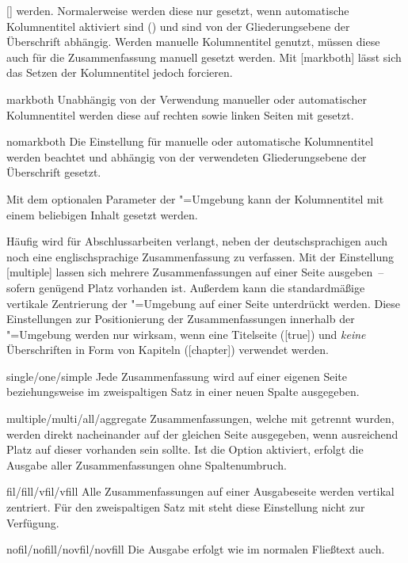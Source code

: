 \begin{Declaration}{[\PSet]}
werden. Normalerweise werden diese nur gesetzt, wenn automatische Kolumnentitel 
aktiviert sind () und sind von der Gliederungsebene der 
Überschrift abhängig. Werden manuelle Kolumnentitel genutzt, müssen diese auch 
für die Zusammenfassung manuell gesetzt werden. Mit [markboth] 
lässt sich das Setzen der Kolumnentitel jedoch forcieren.
%
\begin{values}
\item[markboth]
  Unabhängig von der Verwendung manueller oder automatischer Kolumnentitel 
  werden diese auf rechten sowie linken Seiten mit  gesetzt.
\item[nomarkboth]
  Die Einstellung für manuelle oder automatische Kolumnentitel werden beachtet 
  und abhängig von der verwendeten Gliederungsebene der Überschrift gesetzt.
\end{values}
%
Mit dem optionalen Parameter  der 
"=Umgebung kann der Kolumnentitel mit einem beliebigen 
Inhalt gesetzt werden.

Häufig wird für Abschlussarbeiten verlangt, neben der deutschsprachigen auch 
noch eine englischsprachige Zusammenfassung zu verfassen. Mit der Einstellung 
[multiple] lassen sich mehrere Zusammenfassungen auf einer 
Seite ausgeben~-- sofern genügend Platz vorhanden ist. Außerdem kann die 
standardmäßige vertikale Zentrierung der "=Umgebung 
auf einer Seite unterdrückt werden. Diese Einstellungen zur Positionierung der 
Zusammenfassungen innerhalb der "=Umgebung werden nur 
wirksam, wenn eine Titelseite ([true]) und \emph{keine} 
Überschriften in Form von Kapiteln ([chapter]) verwendet 
werden.
%
\begin{values}
\item[single/one/simple]
  Jede Zusammenfassung wird auf einer eigenen Seite
  beziehungsweise im zweispaltigen Satz in einer neuen Spalte ausgegeben.
\item[multiple/multi/all/aggregate]
  Zusammenfassungen, welche mit  getrennt wurden, werden 
  direkt nacheinander auf der gleichen Seite ausgegeben, wenn ausreichend Platz 
  auf dieser vorhanden sein sollte. Ist die Option  aktiviert,
  erfolgt die Ausgabe aller Zusammenfassungen ohne Spaltenumbruch.
\item[fil/fill/vfil/vfill]
  Alle Zusammenfassungen auf einer Ausgabeseite werden vertikal zentriert. Für 
  den zweispaltigen Satz mit  steht diese Einstellung nicht 
  zur Verfügung.
\item[nofil/nofill/novfil/novfill]
  Die Ausgabe erfolgt wie im normalen Fließtext auch.
\end{values}
\end{Declaration}

